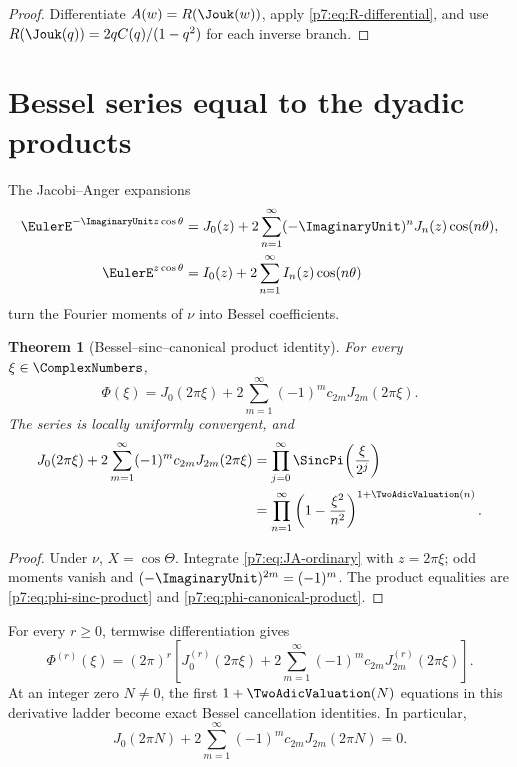 \documentclass[11pt]{article}
\newtheorem{theorem}{Theorem}[section]
\theoremstyle{definition}
\theoremstyle{remark}
\begin{document}
\begin{proof}
Differentiate \(A(w)=R(\Jouk(w))\), apply \eqref{p7:eq:R-differential}, and use
\(R(\Jouk(q))=2qC(q)/(1-q^2)\) for each inverse branch.
\end{proof}

\section{Bessel series equal to the dyadic products}
\label{p7:sec:bessel}

The Jacobi--Anger expansions
\begin{align}
 \EulerE^{-\ImaginaryUnit z\cos\theta}
 &=J_0(z)+2\sum_{n=1}^{\infty}(-\ImaginaryUnit)^nJ_n(z)\cos(n\theta),
 \label{p7:eq:JA-ordinary}\\
 \EulerE^{z\cos\theta}
 &=I_0(z)+2\sum_{n=1}^{\infty}I_n(z)\cos(n\theta)
 \label{p7:eq:JA-modified}
\end{align}
turn the Fourier moments of \(\nu\) into Bessel coefficients.

\begin{theorem}[Bessel--sinc--canonical product identity]
\label{p7:thm:Bessel-Phi}
For every \(\xi\in\ComplexNumbers\),
\begin{equation}
 \boxed{\displaystyle
 \Phi(\xi)=J_0(2\pi\xi)
 +2\sum_{m=1}^{\infty}(-1)^m c_{2m}J_{2m}(2\pi\xi).}
 \label{p7:eq:Phi-Bessel}
\end{equation}
The series is locally uniformly convergent, and
\begin{align}
 J_0(2\pi\xi)+2\sum_{m=1}^{\infty}(-1)^mc_{2m}J_{2m}(2\pi\xi)
 &=\prod_{j=0}^{\infty}\SincPi\!\left(\frac{\xi}{2^j}\right)
 \label{p7:eq:Bessel-sinc}\\
 &=\prod_{n=1}^{\infty}\left(1-\frac{\xi^2}{n^2}\right)^{1+\TwoAdicValuation(n)}.
 \label{p7:eq:Bessel-canonical}
\end{align}
\end{theorem}

\begin{proof}
Under \(\nu\), \(X=\cos\Theta\). Integrate \eqref{p7:eq:JA-ordinary} with
\(z=2\pi\xi\); odd moments vanish and \((-\ImaginaryUnit)^{2m}=(-1)^m\). The product equalities are
\eqref{p7:eq:phi-sinc-product} and \eqref{p7:eq:phi-canonical-product}.
\end{proof}

For every \(r\ge0\), termwise differentiation gives
\begin{equation}
 \Phi^{(r)}(\xi)=(2\pi)^r\left[J_0^{(r)}(2\pi\xi)
 +2\sum_{m=1}^{\infty}(-1)^mc_{2m}J_{2m}^{(r)}(2\pi\xi)\right].
 \label{p7:eq:Phi-Bessel-derivatives}
\end{equation}
At an integer zero \(N\ne0\), the first \(1+\TwoAdicValuation(N)\) equations in this derivative ladder
become exact Bessel cancellation identities. In particular,
\begin{equation}
 J_0(2\pi N)+2\sum_{m=1}^{\infty}(-1)^mc_{2m}J_{2m}(2\pi N)=0.
 \label{p7:eq:Bessel-integer-zero}
\end{equation}
\end{document}
